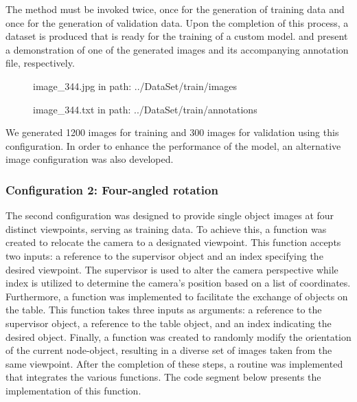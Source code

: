 The method must be invoked twice, once for the generation of training data and once for the generation of validation data. Upon the completion of this process, a dataset is produced that is ready for the training of a custom model.  and  present a demonstration of one of the generated images and its accompanying annotation file, respectively.

\begin{figure}[!h]
    \centering
    \caption{image\_344.jpg in path: ../DataSet/train/images  }
    \label{fig:dataset_train_img}
\end{figure}

\begin{figure}[!h]
    \centering
    \caption{image\_344.txt in path: ../DataSet/train/annotations  }
    \label{fig:dataset_train_ann}
\end{figure}

We generated 1200 images for training and 300 images for validation using this configuration. In order to enhance the performance of the model, an alternative image configuration was also developed.

\subsubsection{Configuration 2: Four-angled rotation}

The second configuration was designed to provide single object images at four distinct viewpoints, serving as training data. To achieve this, a function was created to relocate the camera to a designated viewpoint. This function accepts two inputs: a reference to the supervisor object and an index specifying the desired viewpoint. The supervisor is used to alter the camera perspective while index is utilized to determine the camera's position based on a list of coordinates. Furthermore, a function was implemented to facilitate the exchange of objects on the table. This function takes three inputs as arguments: a reference to the supervisor object, a reference to the table object, and an index indicating the desired object. Finally, a function was created to randomly modify the orientation of the current node-object, resulting in a diverse set of images taken from the same viewpoint. After the completion of these steps, a routine was implemented that integrates the various functions. The code segment below presents the implementation of this function. 


